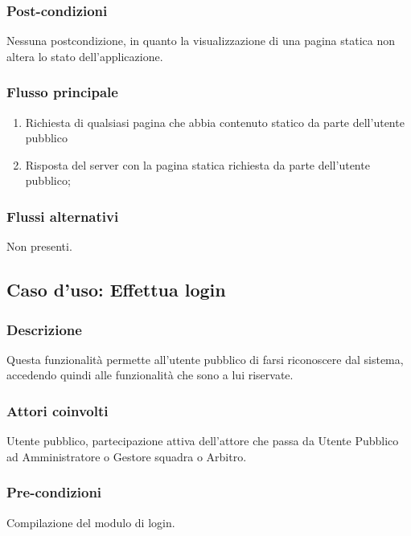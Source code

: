 	\subsubsection*{Post-condizioni}
	Nessuna postcondizione, in quanto la visualizzazione di una pagina statica non altera lo stato dell'applicazione.
	
	\subsubsection*{Flusso principale}
	
	\begin{enumerate}
		
		\item
		Richiesta di qualsiasi pagina che abbia contenuto statico da parte dell'utente pubblico
		
		\item
		Risposta del server con la pagina statica richiesta da parte dell'utente pubblico;
		
	\end{enumerate}
	
	\subsubsection*{Flussi alternativi}
	Non presenti.

%
%
\subsection{Caso d'uso: Effettua login}

	\subsubsection*{Descrizione}
	Questa funzionalità permette all'utente pubblico di farsi riconoscere dal sistema, accedendo quindi alle funzionalità che sono a lui riservate.
	
	\subsubsection*{Attori coinvolti}
	Utente pubblico, partecipazione attiva dell'attore che passa da Utente Pubblico ad Amministratore o Gestore squadra o Arbitro.
	
	\subsubsection*{Pre-condizioni}
	Compilazione del modulo di login.
	
